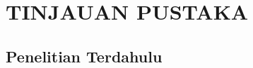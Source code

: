\chapter{TINJAUAN PUSTAKA}
\label{chap:tinjauanpustaka}


\section{Penelitian Terdahulu}
\label{sec:penelitianterdahulu}
  


